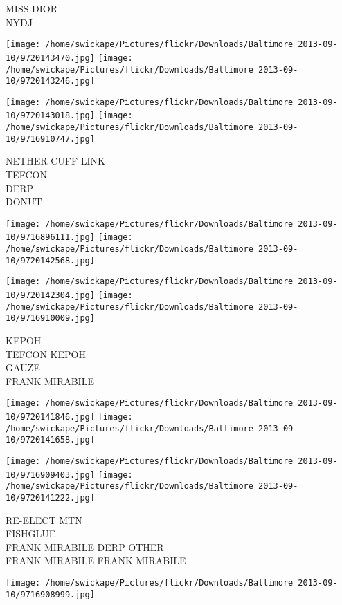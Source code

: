 \documentclass[10pt,letterpaper]{article}
\begin{document}
MISS DIOR\\
NYDJ\\
\pagebreak

\texttt{[image: /home/swickape/Pictures/flickr/Downloads/Baltimore 2013-09-10/9720143470.jpg]}
\texttt{[image: /home/swickape/Pictures/flickr/Downloads/Baltimore 2013-09-10/9720143246.jpg]}

\texttt{[image: /home/swickape/Pictures/flickr/Downloads/Baltimore 2013-09-10/9720143018.jpg]}
\texttt{[image: /home/swickape/Pictures/flickr/Downloads/Baltimore 2013-09-10/9716910747.jpg]}

NETHER CUFF LINK\\
TEFCON\\
DERP\\
DONUT\\
\pagebreak

\texttt{[image: /home/swickape/Pictures/flickr/Downloads/Baltimore 2013-09-10/9716896111.jpg]}
\texttt{[image: /home/swickape/Pictures/flickr/Downloads/Baltimore 2013-09-10/9720142568.jpg]}

\texttt{[image: /home/swickape/Pictures/flickr/Downloads/Baltimore 2013-09-10/9720142304.jpg]}
\texttt{[image: /home/swickape/Pictures/flickr/Downloads/Baltimore 2013-09-10/9716910009.jpg]}

KEPOH\\
TEFCON KEPOH\\
GAUZE\\
FRANK MIRABILE\\
\pagebreak

\texttt{[image: /home/swickape/Pictures/flickr/Downloads/Baltimore 2013-09-10/9720141846.jpg]}
\texttt{[image: /home/swickape/Pictures/flickr/Downloads/Baltimore 2013-09-10/9720141658.jpg]}

\texttt{[image: /home/swickape/Pictures/flickr/Downloads/Baltimore 2013-09-10/9716909403.jpg]}
\texttt{[image: /home/swickape/Pictures/flickr/Downloads/Baltimore 2013-09-10/9720141222.jpg]}

RE{-}ELECT MTN\\
FISHGLUE\\
FRANK MIRABILE DERP OTHER\\
FRANK MIRABILE FRANK MIRABILE\\
\pagebreak

\texttt{[image: /home/swickape/Pictures/flickr/Downloads/Baltimore 2013-09-10/9716908999.jpg]}
\end{document}
